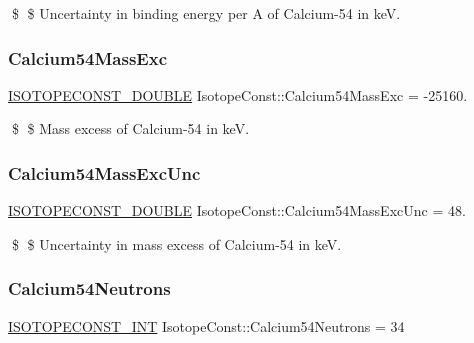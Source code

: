 \$ \$ Uncertainty in binding energy per A of Calcium-\/54 in keV. \mbox{\label{group___isotope_const-_calcium-_ca54_ga5189374d10273a09282e1fae4e7f5e82}} 
\subsubsection{\texorpdfstring{Calcium54\+Mass\+Exc}{Calcium54MassExc}}
{\footnotesize\ttfamily \mbox{\hyperlink{group___isotope_const-_macros_ga8f45a7272ce02c0b4c65c44636ed719a}{I\+S\+O\+T\+O\+P\+E\+C\+O\+N\+S\+T\+\_\+\+D\+O\+U\+B\+LE}} Isotope\+Const\+::\+Calcium54\+Mass\+Exc = -\/25160.}

\$ \$ Mass excess of Calcium-\/54 in keV. \mbox{\label{group___isotope_const-_calcium-_ca54_gafb35091466d9620c5d1cccfb3da11aab}} 
\subsubsection{\texorpdfstring{Calcium54\+Mass\+Exc\+Unc}{Calcium54MassExcUnc}}
{\footnotesize\ttfamily \mbox{\hyperlink{group___isotope_const-_macros_ga8f45a7272ce02c0b4c65c44636ed719a}{I\+S\+O\+T\+O\+P\+E\+C\+O\+N\+S\+T\+\_\+\+D\+O\+U\+B\+LE}} Isotope\+Const\+::\+Calcium54\+Mass\+Exc\+Unc = 48.}

\$ \$ Uncertainty in mass excess of Calcium-\/54 in keV. \mbox{\label{group___isotope_const-_calcium-_ca54_gac1a8c9fd65b31a269f26834ace215e1e}} 
\subsubsection{\texorpdfstring{Calcium54\+Neutrons}{Calcium54Neutrons}}
{\footnotesize\ttfamily \mbox{\hyperlink{group___isotope_const-_macros_ga5f18360b3e99483a35c32d789e62621c}{I\+S\+O\+T\+O\+P\+E\+C\+O\+N\+S\+T\+\_\+\+I\+NT}} Isotope\+Const\+::\+Calcium54\+Neutrons = 34}

